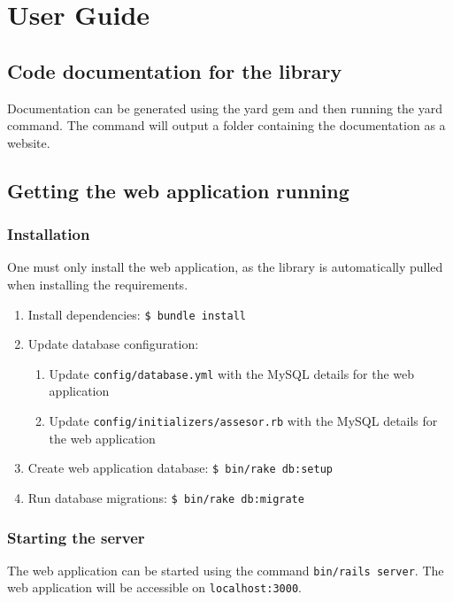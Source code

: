 \chapter{User Guide}

\section{Code documentation for the library}

Documentation can be generated using the yard gem and then running the yard command. The command will output a  folder containing the documentation as a website.

\section{Getting the web application running}
\subsection{Installation}
One must only install the web application, as the library is automatically pulled when installing the requirements.

\begin{enumerate}
    \item Install dependencies: \texttt{\$ bundle install}
    \item Update database configuration:
    \begin{enumerate}
        \item Update \texttt{config/database.yml} with the MySQL details for the web application
        \item Update \texttt{config/initializers/assesor.rb} with the MySQL details for the web application
    \end{enumerate}
    \item Create web application database: \texttt{\$ bin/rake db:setup}
    \item Run database migrations: \texttt{\$ bin/rake db:migrate}
\end{enumerate}

\subsection{Starting the server}

The web application can be started using the command \texttt{bin/rails server}. The web application will be accessible on \texttt{localhost:3000}.

